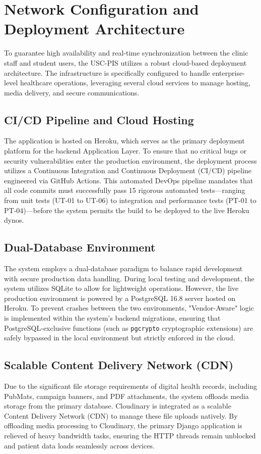 \section{Network Configuration and Deployment Architecture}
To guarantee high availability and real-time synchronization between the clinic staff and student users, the USC-PIS utilizes a robust cloud-based deployment architecture. The infrastructure is specifically configured to handle enterprise-level healthcare operations, leveraging several cloud services to manage hosting, media delivery, and secure communications.

\subsection{CI/CD Pipeline and Cloud Hosting}
The application is hosted on Heroku, which serves as the primary deployment platform for the backend Application Layer. To ensure that no critical bugs or security vulnerabilities enter the production environment, the deployment process utilizes a Continuous Integration and Continuous Deployment (CI/CD) pipeline engineered via GitHub Actions. This automated DevOps pipeline mandates that all code commits must successfully pass 15 rigorous automated tests—ranging from unit tests (UT-01 to UT-06) to integration and performance tests (PT-01 to PT-04)—before the system permits the build to be deployed to the live Heroku dynos.

\subsection{Dual-Database Environment}
The system employs a dual-database paradigm to balance rapid development with secure production data handling. During local testing and development, the system utilizes SQLite to allow for lightweight operations. However, the live production environment is powered by a PostgreSQL 16.8 server hosted on Heroku. To prevent crashes between the two environments, "Vendor-Aware" logic is implemented within the system's backend migrations, ensuring that PostgreSQL-exclusive functions (such as \texttt{pgcrypto} cryptographic extensions) are safely bypassed in the local environment but strictly enforced in the cloud.

\subsection{Scalable Content Delivery Network (CDN)}
Due to the significant file storage requirements of digital health records, including PubMats, campaign banners, and PDF attachments, the system offloads media storage from the primary database. Cloudinary is integrated as a scalable Content Delivery Network (CDN) to manage these file uploads natively. By offloading media processing to Cloudinary, the primary Django application is relieved of heavy bandwidth tasks, ensuring the HTTP threads remain unblocked and patient data loads seamlessly across devices.

